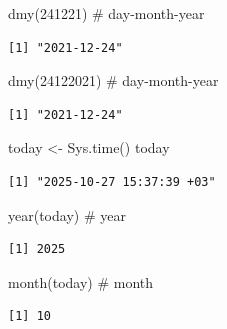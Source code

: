 \documentclass[
  letterpaper,
  DIV=11,
  numbers=noendperiod]{scrreprt}
\newenvironment{Shaded}{\begin{snugshade}}{\end{snugshade}}
\newcommand{\CommentTok}[1]{\textcolor[rgb]{0.37,0.37,0.37}{#1}}
\newcommand{\DecValTok}[1]{\textcolor[rgb]{0.68,0.00,0.00}{#1}}
\newcommand{\FunctionTok}[1]{\textcolor[rgb]{0.28,0.35,0.67}{#1}}
\newcommand{\NormalTok}[1]{\textcolor[rgb]{0.00,0.23,0.31}{#1}}
\newcommand{\OtherTok}[1]{\textcolor[rgb]{0.00,0.23,0.31}{#1}}
\begin{document}
\begin{Shaded}
\begin{Highlighting}[]
\FunctionTok{dmy}\NormalTok{(}\DecValTok{241221}\NormalTok{) }\CommentTok{\# day{-}month{-}year}
\end{Highlighting}
\end{Shaded}

\begin{verbatim}
[1] "2021-12-24"
\end{verbatim}

\begin{Shaded}
\begin{Highlighting}[]
\FunctionTok{dmy}\NormalTok{(}\DecValTok{24122021}\NormalTok{) }\CommentTok{\# day{-}month{-}year}
\end{Highlighting}
\end{Shaded}

\begin{verbatim}
[1] "2021-12-24"
\end{verbatim}

\begin{Shaded}
\begin{Highlighting}[]
\NormalTok{today }\OtherTok{\textless{}{-}} \FunctionTok{Sys.time}\NormalTok{()}
\NormalTok{today}
\end{Highlighting}
\end{Shaded}

\begin{verbatim}
[1] "2025-10-27 15:37:39 +03"
\end{verbatim}

\begin{Shaded}
\begin{Highlighting}[]
\FunctionTok{year}\NormalTok{(today) }\CommentTok{\# year}
\end{Highlighting}
\end{Shaded}

\begin{verbatim}
[1] 2025
\end{verbatim}

\begin{Shaded}
\begin{Highlighting}[]
\FunctionTok{month}\NormalTok{(today) }\CommentTok{\# month}
\end{Highlighting}
\end{Shaded}

\begin{verbatim}
[1] 10
\end{verbatim}
\end{document}
